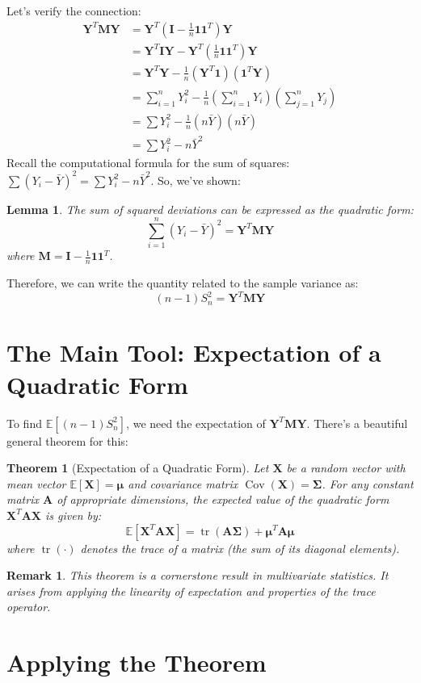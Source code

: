 \documentclass[11pt]{article}
\newcommand{\E}{\mathbb{E}} %
\newcommand{\tr}{\operatorname{tr}} %
\newcommand{\Cov}{\operatorname{Cov}} %
\newcommand{\bY}{\bm{Y}} %
\newcommand{\bM}{\mathbf{M}} %
\newcommand{\bI}{\mathbf{I}} %
\newcommand{\bSigma}{\boldsymbol{\Sigma}} %
\newcommand{\bmu}{\boldsymbol{\mu}} %
\newcommand{\bone}{\mathbf{1}} %
\newtheorem{theorem}{Theorem}
\newtheorem{lemma}{Lemma}
\newtheorem{remark}{Remark}
\begin{document}
Let's verify the connection:
\begin{align*}
\bY^T \bM \bY &= \bY^T \left( \bI - \frac{1}{n}\bone\bone^T \right) \bY \\
&= \bY^T \bI \bY - \bY^T \left( \frac{1}{n}\bone\bone^T \right) \bY \\
&= \bY^T \bY - \frac{1}{n} (\bY^T \bone) (\bone^T \bY) \\
&= \sum_{i=1}^n Y_i^2 - \frac{1}{n} \left( \sum_{i=1}^n Y_i \right) \left( \sum_{j=1}^n Y_j \right) \\
&= \sum Y_i^2 - \frac{1}{n} (n\bar{Y})(n\bar{Y}) \\
&= \sum Y_i^2 - n \bar{Y}^2
\end{align*}
Recall the computational formula for the sum of squares: $\sum (Y_i - \bar{Y})^2 = \sum Y_i^2 - n\bar{Y}^2$. So, we've shown:
\begin{lemma}
The sum of squared deviations can be expressed as the quadratic form:
\[ \sum_{i=1}^n (Y_i - \bar{Y})^2 = \bY^T \bM \bY \]
where $\bM = \bI - \frac{1}{n}\bone\bone^T$.
\end{lemma}
Therefore, we can write the quantity related to the sample variance as:
\[ (n-1)S_n^2 = \bY^T \bM \bY \]

\section{The Main Tool: Expectation of a Quadratic Form}

To find $\E[(n-1)S_n^2]$, we need the expectation of $\bY^T \bM \bY$. There's a beautiful general theorem for this:

\begin{theorem}[Expectation of a Quadratic Form]
Let $\mathbf{X}$ be a random vector with mean vector $\E[\mathbf{X}] = \bmu$ and covariance matrix $\Cov(\mathbf{X}) = \bSigma$. For any constant matrix $\mathbf{A}$ of appropriate dimensions, the expected value of the quadratic form $\mathbf{X}^T \mathbf{A} \mathbf{X}$ is given by:
\[ \E[\mathbf{X}^T \mathbf{A} \mathbf{X}] = \tr(\mathbf{A} \bSigma) + \bmu^T \mathbf{A} \bmu \]
where $\tr(\cdot)$ denotes the trace of a matrix (the sum of its diagonal elements).
\end{theorem}
\begin{remark}
This theorem is a cornerstone result in multivariate statistics. It arises from applying the linearity of expectation and properties of the trace operator.
\end{remark}

\section{Applying the Theorem}
\end{document}

